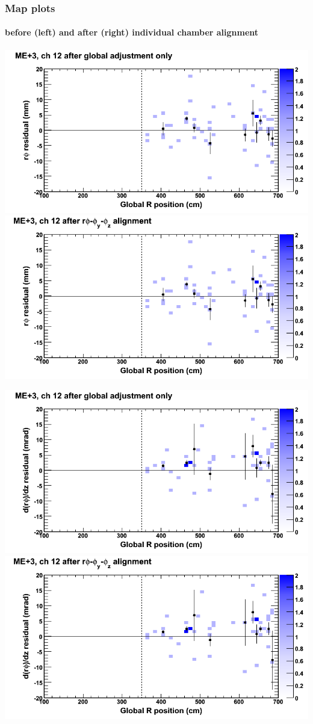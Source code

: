 \documentclass[compress]{beamer}
\begin{document}
\begin{frame}
\frametitle{Map plots}
\framesubtitle{before (left) and after (right) individual chamber alignment}
\includegraphics[width=0.5\linewidth]{ringmapplots_3dof/before_CSCvsr_mep3ch12_x.png} \includegraphics[width=0.5\linewidth]{ringmapplots_3dof/after_CSCvsr_mep3ch12_x.png}

\includegraphics[width=0.5\linewidth]{ringmapplots_3dof/before_CSCvsr_mep3ch12_dxdz.png} \includegraphics[width=0.5\linewidth]{ringmapplots_3dof/after_CSCvsr_mep3ch12_dxdz.png}
\end{frame}
\end{document}
